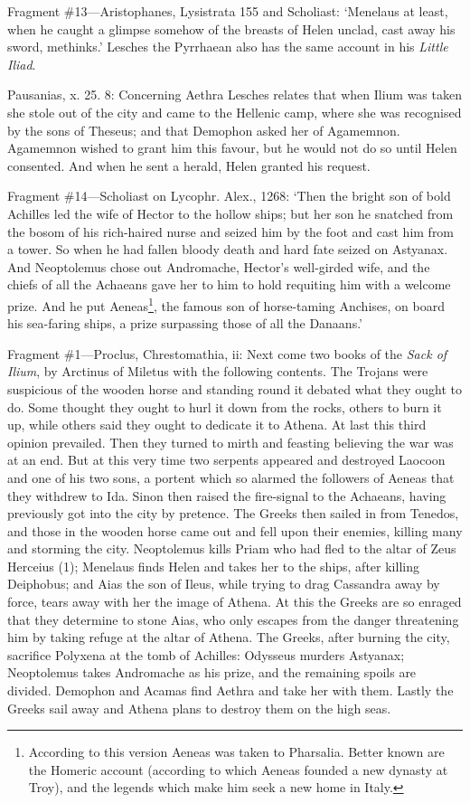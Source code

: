 Fragment \#13—Aristophanes, Lysistrata 155 and Scholiast: ‘Menelaus
at least, when he caught a glimpse somehow of the breasts of Helen unclad, cast
away his sword, methinks.’ Lesches the Pyrrhaean also has the same
account in his \emph{Little Iliad}.

Pausanias, x. 25. 8: Concerning Aethra Lesches relates that when Ilium was
taken she stole out of the city and came to the Hellenic camp, where she was
recognised by the sons of Theseus; and that Demophon asked her of Agamemnon.
Agamemnon wished to grant him this favour, but he would not do so until Helen
consented. And when he sent a herald, Helen granted his request.

Fragment \#14—Scholiast on Lycophr. Alex., 1268: ‘Then the bright
son of bold Achilles led the wife of Hector to the hollow ships; but her son he
snatched from the bosom of his rich-haired nurse and seized him by the foot and
cast him from a tower. So when he had fallen bloody death and hard fate seized
on Astyanax. And Neoptolemus chose out Andromache, Hector’s well-girded
wife, and the chiefs of all the Achaeans gave her to him to hold requiting him
with a welcome prize. And he put Aeneas\footnote{According to this version
Aeneas was taken to Pharsalia. Better known are the Homeric account (according
to which Aeneas founded a new dynasty at Troy), and the legends which make him
seek a new home in Italy.}, the
famous son of horse-taming Anchises, on board his sea-faring ships, a prize
surpassing those of all the Danaans.’


Fragment \#1—Proclus, Chrestomathia, ii: Next come two books of the
\emph{Sack of Ilium}, by Arctinus of Miletus with the following contents.
The Trojans were suspicious of the wooden horse and standing round it debated
what they ought to do. Some thought they ought to hurl it down from the rocks,
others to burn it up, while others said they ought to dedicate it to Athena. At
last this third opinion prevailed. Then they turned to mirth and feasting
believing the war was at an end. But at this very time two serpents appeared
and destroyed Laocoon and one of his two sons, a portent which so alarmed the
followers of Aeneas that they withdrew to Ida. Sinon then raised the
fire-signal to the Achaeans, having previously got into the city by pretence.
The Greeks then sailed in from Tenedos, and those in the wooden horse came out
and fell upon their enemies, killing many and storming the city. Neoptolemus
kills Priam who had fled to the altar of Zeus Herceius (1); Menelaus finds
Helen and takes her to the ships, after killing Deiphobus; and Aias the son of
Ileus, while trying to drag Cassandra away by force, tears away with her the
image of Athena. At this the Greeks are so enraged that they determine to stone
Aias, who only escapes from the danger threatening him by taking refuge at the
altar of Athena. The Greeks, after burning the city, sacrifice Polyxena at the
tomb of Achilles: Odysseus murders Astyanax; Neoptolemus takes Andromache as
his prize, and the remaining spoils are divided. Demophon and Acamas find
Aethra and take her with them. Lastly the Greeks sail away and Athena plans to
destroy them on the high seas.

